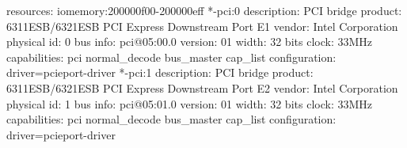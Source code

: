 \documentclass[mingoth,a4paper]{jsarticle}
\begin{document}
\begin{commandline}
                resources: iomemory:200000f00-200000eff
              *-pci:0
                   description: PCI bridge
                   product: 6311ESB/6321ESB PCI Express Downstream Port E1
                   vendor: Intel Corporation
                   physical id: 0
                   bus info: pci@05:00.0
                   version: 01
                   width: 32 bits
                   clock: 33MHz
                   capabilities: pci normal_decode bus_master cap_list
                   configuration: driver=pcieport-driver
              *-pci:1
                   description: PCI bridge
                   product: 6311ESB/6321ESB PCI Express Downstream Port E2
                   vendor: Intel Corporation
                   physical id: 1
                   bus info: pci@05:01.0
                   version: 01
                   width: 32 bits
                   clock: 33MHz
                   capabilities: pci normal_decode bus_master cap_list
                   configuration: driver=pcieport-driver
\end{commandline}
\end{document}
